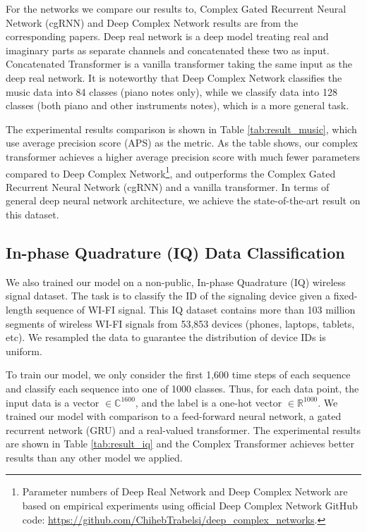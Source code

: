 \documentclass{article}
\begin{document}
For the networks we compare our results to, Complex Gated Recurrent Neural Network (cgRNN) \cite{wolter2018complex} and Deep Complex Network \cite{trabelsi2017deep} results are from the corresponding papers. Deep real network is a deep model treating real and imaginary parts as separate channels and concatenated these two as input. Concatenated Transformer is a vanilla transformer taking the same input as the deep real network. It is noteworthy that Deep Complex Network \cite{trabelsi2017deep} classifies the music data into 84 classes (piano notes only), while we classify data into 128 classes (both piano and other instruments notes), which is a more general task.  

The experimental results comparison is shown in Table \ref{tab:result_music}, which use average precision score (APS) as the metric. As the table shows, our complex transformer achieves a higher average precision score with much fewer parameters compared to Deep Complex Network\footnote{Parameter numbers of Deep Real Network and Deep Complex Network are based on empirical experiments using official Deep Complex Network GitHub code: \url{https://github.com/ChihebTrabelsi/deep_complex_networks}.}, and outperforms the Complex Gated Recurrent Neural Network (cgRNN) \cite{wolter2018complex} and a vanilla transformer. In terms of general deep neural network architecture, we achieve the state-of-the-art result on this dataset.

\subsection{In-phase Quadrature (IQ) Data Classification}


We also trained our model on a non-public, In-phase Quadrature (IQ) wireless signal dataset. The task is to classify the ID of the signaling device given a fixed-length sequence of WI-FI signal. This IQ dataset contains more than 103 million segments of wireless WI-FI signals from 53,853 devices (phones, laptops, tablets, etc). We resampled the data to guarantee the distribution of device IDs is uniform.

To train our model, we only consider the first 1,600 time steps of each sequence and classify each sequence into one of 1000 classes. Thus, for each data point, the input data is a vector $\in\mathbb{C}^{1600}$, and the label is a one-hot vector $\in\mathbb{R}^{1000}$. We trained our model with comparison to a feed-forward neural network, a gated recurrent network (GRU) \cite{cho2014learning} and a real-valued transformer. The experimental results are shown in Table \ref{tab:result_iq} and the Complex Transformer achieves better results than any other model we applied.
\end{document}
